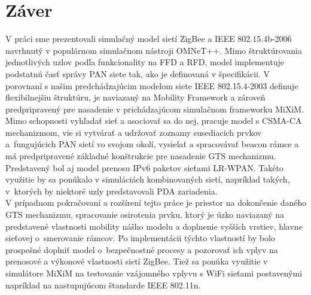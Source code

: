 \chapter{Záver}
\indent\indent V práci sme prezentovali simulačný model sietí ZigBee a IEEE 802.15.4b-2006 navrhnutý v populárnom simulačnom nástroji OMNeT++. Mimo štruktúrovania jednotlivých uzlov podľa funkcionality na FFD a RFD, model implementuje podstatnú časť správy PAN siete tak, ako je definovaná v špecifikácii. V porovnaní s našim predchádzajúcim modelom siete IEEE 802.15.4-2003 definuje flexibilnejšiu štruktúru, je naviazaný na Mobility Framework a zároveň predpripravený pre nasadenie v prichádzajúcom simulačnom frameworku MiXiM. Mimo schopnosti vyhľadať sieť a asociovať sa do nej, pracuje model s CSMA-CA mechanizmom, vie si vytvárať a udržovať zoznamy susediacich prvkov a~fungujúcich PAN sietí vo svojom okolí, vysielať a spracovávať beacon rámce a má predpripravené základné konštrukcie pre nasadenie GTS mechanizmu.\\
\indent Predstavený bol aj model prenosu IPv6 paketov sieťami LR-WPAN. Takéto využitie by sa ponúkalo v simuláciách kombinovaných sietí, napríklad takých, v~ktorých by niektoré uzly predstavovali PDA zariadenia.\\
\indent V prípadnom pokračovaní a rozšírení tejto práce je priestor na dokončenie daného GTS mechanizmu, spracovanie osirotenia prvku, ktorý je úzko naviazaný na predstavené vlastnosti mobility nášho modelu a doplnenie vyšších vrstiev, hlavne sieťovej o~smerovanie rámcov. Po implementácii týchto vlastností by bolo prospešné doplniť model o~bezpečnostné procesy a pozorovať ich vplyv na prenosové a výkonové vlastnosti sietí ZigBee. Tiež sa ponúka využitie v simulátore MiXiM na testovanie vzájomného vplyvu s WiFi sieťami postavenými napríklad na nastupujúcom štandarde IEEE 802.11n.\\